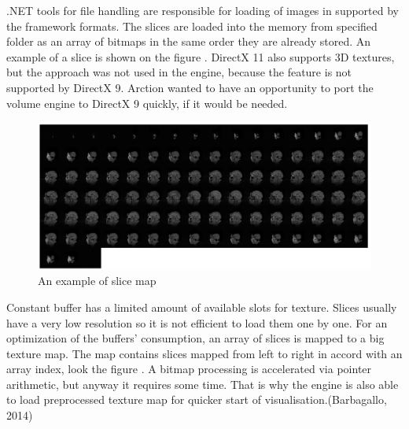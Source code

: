 \documentclass[twoside, english, 11pt]{report}
\begin{document}
.NET tools for file handling are responsible for loading of images in supported by the framework formats. The slices are loaded into the memory from specified folder as an array of bitmaps in the same order they are already stored. An example of a slice is shown on the figure \label{fig:slice}. DirectX 11 also supports 3D textures, but the approach was not used in the engine, because the feature is not supported by DirectX 9. Arction wanted to have an opportunity to port the volume engine to DirectX 9 quickly, if it would be needed. \\

\begin{figure}[!h]
\centerline{\includegraphics[scale = 0.35]{img/map}}
\caption{An example of slice map\label{fig:map}}
\end{figure}
Constant buffer has a limited amount of available slots for texture. Slices usually have a very low resolution so it is not efficient to load them one by one. For an optimization of the buffers' consumption, an array of slices is mapped to a big texture map. The map contains slices mapped from left to right in accord with an array index, look the figure \label{fig:map}. A bitmap processing is accelerated via pointer arithmetic, but anyway it requires some time. That is why the engine is also able to load preprocessed texture map for quicker start of visualisation.(Barbagallo, 2014) \\
\end{document}

